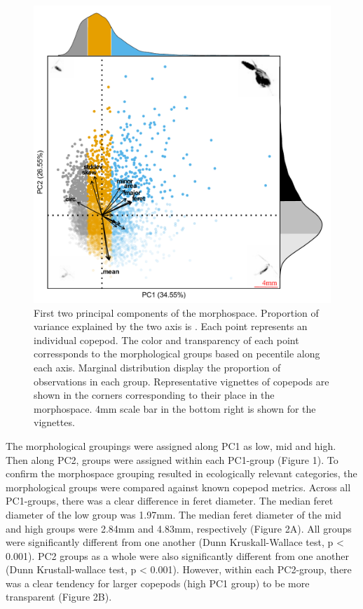 \documentclass[
  letterpaper,
  DIV=11,
  numbers=noendperiod]{scrartcl}
\begin{document}
\begin{figure}

{\centering \includegraphics{../media/figure_01.pdf}

}

\caption{First two principal components of the morphospace. Proportion
of variance explained by the two axis is . Each point represents an
individual copepod. The color and transparency of each point
corressponds to the morphological groups based on pecentile along each
axis. Marginal distribution display the proportion of observations in
each group. Representative vignettes of copepods are shown in the
corners corresponding to their place in the morphospace. 4mm scale bar
in the bottom right is shown for the vignettes.}

\end{figure}

The morphological groupings were assigned along PC1 as low, mid and
high. Then along PC2, groups were assigned within each PC1-group (Figure
1). To confirm the morphospace grouping resulted in ecologically
relevant categories, the morphological groups were compared against
known copepod metrics. Across all PC1-groups, there was a clear
difference in feret diameter. The median feret diameter of the low group
was 1.97mm. The median feret diameter of the mid and high groups were
2.84mm and 4.83mm, respectively (Figure 2A). All groups were
significantly different from one another (Dunn Kruskall-Wallace test, p
\textless{} 0.001). PC2 groups as a whole were also significantly
different from one another (Dunn Krustall-wallace test, p \textless{}
0.001). However, within each PC2-group, there was a clear tendency for
larger copepods (high PC1 group) to be more transparent (Figure 2B).
\end{document}
